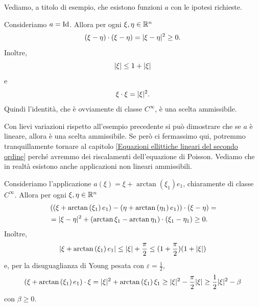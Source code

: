 Vediamo, a titolo di esempio, che esistono funzioni $a$ con le ipotesi richieste.
\begin{esempio}
	Consideriamo $a = \textup{Id}$. Allora per ogni $\xi,\eta \in \mathbb{R}^n$
	\[ (\xi - \eta) \cdot (\xi-\eta) = \lvert\xi - \eta\rvert^2 \ge 0. \]
	Inoltre,
	\[ \lvert\xi\rvert\le 1 + \lvert\xi\rvert \]
	e
	\[ \xi \cdot \xi = \lvert\xi\rvert^2. \]
	Quindi l'identità, che è ovviamente di classe $C^\infty$, è una scelta ammissibile.
\end{esempio}
Con lievi variazioni rispetto all'esempio precedente si può dimostrare che se $a$ è lineare, allora è una scelta ammissibile. Se però ci fermassimo qui, potremmo tranquillamente tornare al capitolo \ref{Equazioni ellittiche lineari del secondo ordine} perché avremmo dei riscalamenti dell'equazione di Poisson. Vediamo che in realtà esistono anche applicazioni non lineari ammissibili.
\begin{esempio}
	Consideriamo l'applicazione $a(\xi) = \xi + \arctan \left( \xi_1\right) e_1$, chiaramente di classe $C^\infty$. Allora per ogni $\xi,\eta \in \mathbb{R}^n$
	\begin{align*}
		&\left( \left( \xi+\arctan \left( \xi_1\right) e_1 \right)  - \left( \eta+\arctan \left( \eta_1\right)e_1 \right) \right)  \cdot (\xi-\eta) = \\
		&=\lvert\xi - \eta\rvert^2 + (\arctan\xi_1-\arctan\eta_1)\cdot(\xi_1 - \eta_1) \ge 0.
	\end{align*}
	Inoltre,
	\[ \lvert\xi + \arctan \left( \xi_1\right)e_1 \rvert\le \lvert\xi\rvert + \frac{\pi}{2} \le (1+\frac{\pi}{2})(1+\lvert\xi\rvert)\]
	e, per la disuguaglianza di Young pesata con $\varepsilon = \frac{1}{2}$,
	\[ (\xi+\arctan \left( \xi_1\right)e_1) \cdot \xi = \lvert\xi\rvert^2 +\arctan \left( \xi_1\right)\xi_1 \ge \lvert\xi\rvert^2 - \frac{\pi}{2}\lvert\xi\rvert \ge  \frac{1}{2} \lvert\xi\rvert^2 - \beta\]
	con $\beta \ge 0$.
\end{esempio}

